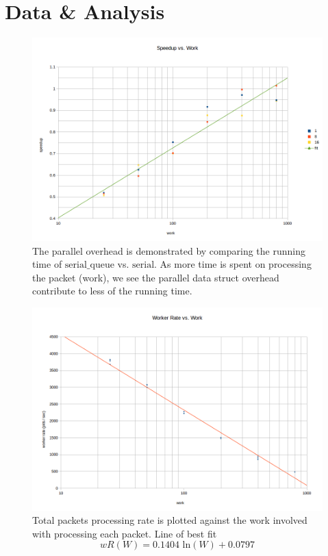 \documentclass{article}
\newcommand{\cpart}[1]{\newblock{\LARGE {\\\\#1}}}
\newcommand{\code}[1]{\texttt{$\text{#1}$}}
\begin{document}
\section{Data \& Analysis}

\cpart{Parallel Overhead}

\begin{figure}
\begin{center}
	\includegraphics[scale=0.5]{speedup_vs_work.png}
	\caption{The parallel overhead is demonstrated by comparing the running time of \code{serial\_queue} vs. \code{serial}. As more time is spent on processing the packet (work), we see the parallel data struct overhead contribute to less of the running time.}
	\label{speedup_vs_work}
\end{center}
\end{figure}

\begin{figure}
\begin{center}
	\includegraphics[scale=0.5]{worker_rate.png}
	\caption{Total packets processing rate is plotted against the work involved with processing each packet. Line of best fit $$wR(W) = 0.1404\text{ ln}(W) + 0.0797$$}
	\label{worker_rate}
\end{center}
\end{figure}
\end{document}

